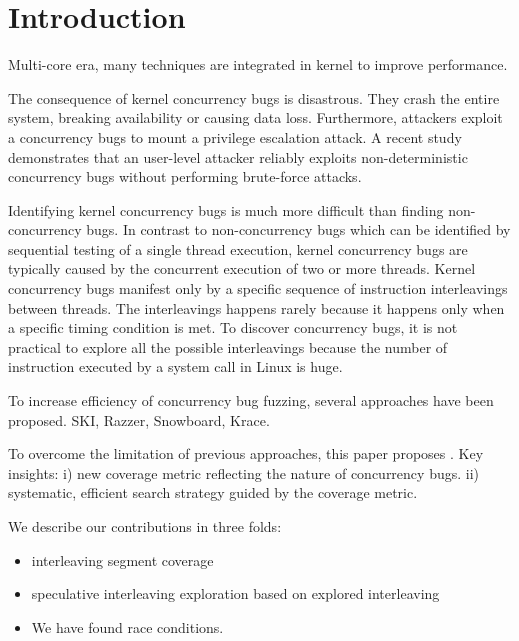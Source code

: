 \section{Introduction}
\label{s:intro}


Multi-core era, many techniques are integrated in kernel to improve performance. 

The consequence of kernel concurrency bugs is disastrous. They crash
the entire system, breaking availability or causing data loss. 
Furthermore, attackers 
exploit a concurrency bugs to mount a privilege escalation attack.
A recent study~\cite{exprace} demonstrates that an user-level attacker 
reliably exploits non-deterministic concurrency bugs without performing
brute-force attacks.

Identifying kernel concurrency bugs is much more difficult than 
finding non-concurrency bugs. 
In contrast to non-concurrency bugs which can be identified by 
sequential testing of a single thread execution,
kernel concurrency bugs are typically caused by the concurrent execution 
of two or more threads.
Kernel concurrency bugs manifest only by a specific sequence of
instruction interleavings between threads. The interleavings happens 
rarely because it happens only when a specific timing condition is met.
To discover concurrency bugs, it is not practical to explore all
the possible interleavings because the number of instruction
executed by a system call in Linux is huge.

To increase efficiency of concurrency bug fuzzing, several approaches 
have been proposed. SKI, Razzer, Snowboard, Krace.

To overcome the limitation of previous approaches, this paper proposes
\sys. Key insights: 
i) new coverage metric reflecting the nature of concurrency bugs.
ii) systematic, efficient search strategy guided by the coverage metric.




We describe our contributions in three folds:

\begin{itemize}
\item interleaving segment coverage
\item speculative interleaving exploration based on explored interleaving
\item We have found \totalbugs race conditions.
\end{itemize}

